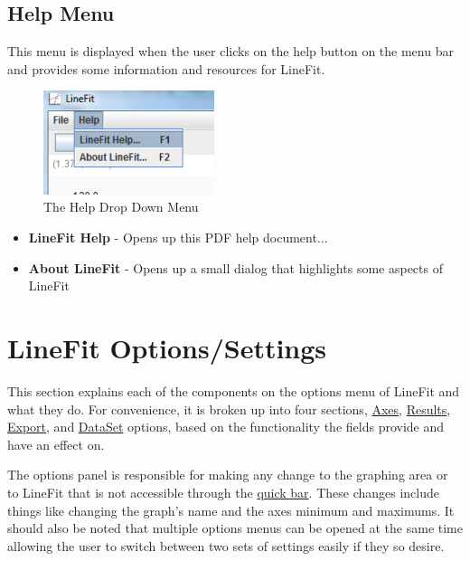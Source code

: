 \documentclass[titlepage,12pt]{article}
\begin{document}
\subsection{Help Menu}

This menu is displayed when the user clicks on the help button on the menu bar and provides some information and resources for LineFit.

\begin{figure}[ht!]
\centering
\includegraphics[width=5cm]{images/HelpMenu.png}
\caption{The Help Drop Down Menu}
\end{figure}

\begin{itemize}
\item \textbf{LineFit Help} - Opens up this PDF help document...
\item \textbf{About LineFit} - Opens up a small dialog that highlights some aspects of LineFit
\end{itemize}



\section{LineFit Options/Settings}
\label{sec:options}

This section explains each of the components on the options menu of LineFit and what they do. For convenience, it is broken up into four sections, \hyperref[subsec:axes]{Axes}, \hyperref[subsec:results]{Results}, \hyperref[subsec:export]{Export}, and \hyperref[subsec:dataset]{DataSet} options, based on the functionality the fields provide and have an effect on.

The options panel is responsible for making any change to the graphing area or to LineFit that is not accessible through the \hyperref[sec:quickbar]{quick bar}. These changes include things like changing the graph's name and the axes minimum and maximums. It should also be noted that multiple options menus can be opened at the same time allowing the user to switch between two sets of settings easily if they so desire.
\end{document}
